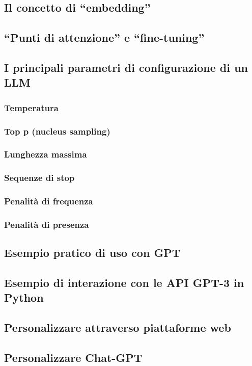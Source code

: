     \subsection{Il concetto di ``embedding''}
    \subsection{``Punti di attenzione'' e ``fine-tuning''}
    \subsection{I principali parametri di configurazione di un LLM}
        \subsubsection{Temperatura}
        \subsubsection{Top p (nucleus sampling)}
        \subsubsection{Lunghezza massima}
        \subsubsection{Sequenze di stop}
        \subsubsection{Penalità di frequenza}
        \subsubsection{Penalità di presenza}
    \subsection{Esempio pratico di uso con GPT}
    \subsection{Esempio di interazione con le API GPT-3 in Python}
    \subsection{Personalizzare attraverso piattaforme web}
    \subsection{Personalizzare Chat-GPT}

